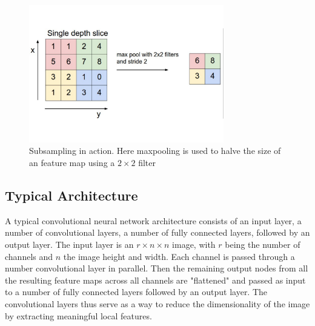 \begin{figure}
\centering
\includegraphics[trim=0cm 0cm 0cm 0cm, clip=true, height=60mm]{Chapter2/pooling.pdf}
\caption{Subsampling in action. Here maxpooling is used to halve the size of an feature map using a $2 \times 2$ filter}
\end{figure}

\subsection{Typical Architecture}

\noindent A typical convolutional neural network architecture consists of an input layer, a number of convolutional layers, a number of fully connected layers, followed by an output layer. The input layer is an $r \times n \times n$ image, with $r$ being the number of channels and $n$ the image height and width. Each channel is passed through a number convolutional layer in parallel. Then the remaining output nodes from all the resulting feature maps across all channels are "flattened" and passed as input to a number of fully connected layers followed by an output layer. The convolutional layers thus serve as a way to reduce the dimensionality of the image by extracting meaningful local features.








